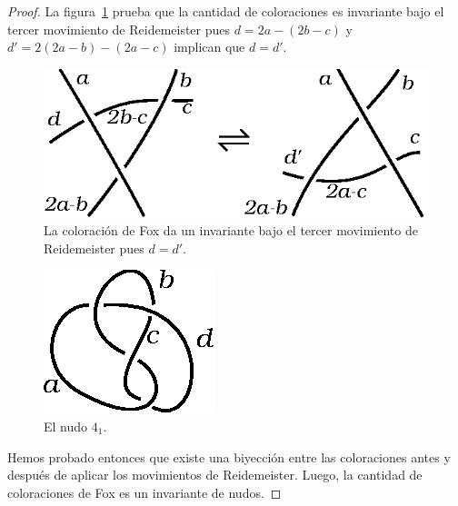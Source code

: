 \documentclass[graybox]{svmult}
\begin{document}
\begin{theorem}
\begin{proof}
		La figura~\ref{fig:coloringR3} prueba que la cantidad de
		coloraciones es invariante bajo el tercer movimiento de Reidemeister
		pues $d=2a-(2b-c)$ y $d'=2(2a-b)-(2a-c)$ implican que $d=d'$.
		\begin{figure}[ht]
			\centering
				\includegraphics[scale=0.6]{images/coloringR3}
				\caption{La coloración de Fox da un invariante bajo el tercer movimiento
				de Reidemeister pues $d=d'$.}
				\label{fig:coloringR3}
					\end{figure}
		\begin{figure}[ht]
				\centering
				\includegraphics[scale=0.6]{images/labels4_1}
				\caption{El nudo $4_1$.}
				\label{fig:labels4_1}
		\end{figure}

        Hemos probado entonces que existe una biyección entre las coloraciones
        antes y después de aplicar los movimientos de Reidemeister. Luego, la
        cantidad de coloraciones de Fox es un invariante de nudos.
    \end{proof}
\end{theorem}
\end{document}
